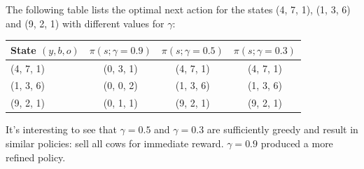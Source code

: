 \documentclass[a4paper]{article}
\begin{document}
The following table lists the optimal next action for the states (4, 7, 1), 
(1, 3, 6) and (9, 2, 1) with different values for $\gamma$:

\begin{tabular}{ l | c | c | c }
State $(y, b, o)$ & $\pi(s; \gamma = 0.9)$ & $\pi(s; \gamma = 0.5)$ & $\pi(s; \gamma = 0.3)$ \\
\hline
(4, 7, 1) & (0, 3, 1) & (4, 7, 1) & (4, 7, 1) \\ 
\hline
(1, 3, 6) & (0, 0, 2) & (1, 3, 6) & (1, 3, 6) \\
\hline
(9, 2, 1) & (0, 1, 1) & (9, 2, 1) & (9, 2, 1) \\
\end{tabular}

It's interesting to see that $\gamma = 0.5$ and $\gamma = 0.3$ are sufficiently
greedy and result in similar policies: sell all cows for immediate reward.
$\gamma = 0.9$ produced a more refined policy.
\end{document}
